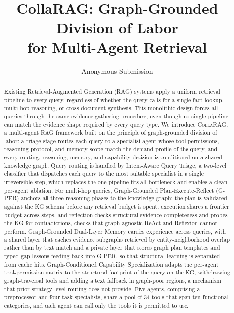 \documentclass[11pt,a4paper]{article}
\title{CollaRAG: Graph-Grounded Division of Labor \\ for Multi-Agent Retrieval}
\author{
  Anonymous Submission
}
\date{}
\newcommand{\sys}{\textsc{CollaRAG}}
\begin{document}
\maketitle

\begin{abstract}
Existing Retrieval-Augmented Generation (RAG) systems apply a uniform retrieval pipeline to every query, regardless of whether the query calls for a single-fact lookup, multi-hop reasoning, or cross-document synthesis.
This monolithic design forces all queries through the same evidence-gathering procedure, even though no single pipeline can match the evidence shape required by every query type.
We introduce \sys{}, a multi-agent RAG framework built on the principle of graph-grounded division of labor: a triage stage routes each query to a specialist agent whose tool permissions, reasoning protocol, and memory scope match the demand profile of the query, and every routing, reasoning, memory, and capability decision is conditioned on a shared knowledge graph.
Query routing is handled by Intent-Aware Query Triage, a two-level classifier that dispatches each query to the most suitable specialist in a single irreversible step, which replaces the one-pipeline-fits-all bottleneck and enables a clean per-agent ablation.
For multi-hop queries, Graph-Grounded Plan-Execute-Reflect (G-PER) anchors all three reasoning phases to the knowledge graph: the plan is validated against the KG schema before any retrieval budget is spent, execution shares a frontier budget across steps, and reflection checks structural evidence completeness and probes the KG for contradictions, checks that graph-agnostic ReAct and Reflexion cannot perform.
Graph-Grounded Dual-Layer Memory carries experience across queries, with a shared layer that caches evidence subgraphs retrieved by entity-neighborhood overlap rather than by text match and a private layer that stores graph plan templates and typed gap lessons feeding back into G-PER, so that structural learning is separated from cache hits.
Graph-Conditioned Capability Specialization adapts the per-agent tool-permission matrix to the structural footprint of the query on the KG, withdrawing graph-traversal tools and adding a text fallback in graph-poor regions, a mechanism that prior strategy-level routing does not provide.
Five agents, comprising a preprocessor and four task specialists, share a pool of 34 tools that span ten functional categories, and each agent can call only the tools it is permitted to use.

\end{abstract}
\end{document}
